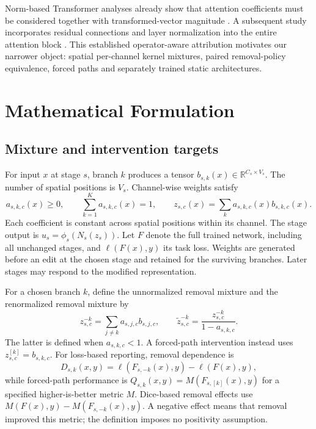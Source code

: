 \documentclass[mathematics,article,submit,pdftex,moreauthors]{Definitions/mdpi}
\begin{document}
Norm-based Transformer analyses already show that attention coefficients
must be considered together with transformed-vector magnitude
\cite{kobayashi2020norm}. A subsequent study incorporates residual
connections and layer normalization into the entire attention block
\cite{kobayashi2021normalization}. This established operator-aware attribution
motivates our narrower object: spatial per-channel kernel mixtures, paired
removal-policy equivalence, forced paths and separately trained static
architectures.

\section{Mathematical Formulation}
\subsection{Mixture and intervention targets}
For input $x$ at stage $s$, branch $k$ produces a tensor
$b_{s,k}(x)\in\mathbb{R}^{C_s\times V_s}$. The number of spatial positions
is $V_s$. Channel-wise weights satisfy
\begin{equation}
 a_{s,k,c}(x)\geq0,\qquad \sum_{k=1}^K a_{s,k,c}(x)=1,
 \qquad z_{s,c}(x)=\sum_k a_{s,k,c}(x)b_{s,k,c}(x).
\end{equation}
Each coefficient is constant across spatial positions within its channel.
The stage output is $u_s=\phi_s(N_s(z_s))$. Let $F$ denote the full trained
network, including all unchanged stages, and $\ell(F(x),y)$ its task loss.
Weights are generated before an edit at the chosen stage and retained for the
surviving branches. Later stages may respond to the modified representation.

For a chosen branch $k$, define the unnormalized removal mixture and the
renormalized removal mixture by
\begin{equation}\label{eq:remove}
 z_{s,c}^{-k}=\sum_{j\ne k}a_{s,j,c}b_{s,j,c},\qquad
 \widetilde z_{s,c}^{-k}=\frac{z_{s,c}^{-k}}{1-a_{s,k,c}}.
\end{equation}
The latter is defined when $a_{s,k,c}<1$. A forced-path intervention instead
uses $z_{s,c}^{[k]}=b_{s,k,c}$. For loss-based reporting, removal dependence is
\begin{equation}
 D_{s,k}(x,y)=\ell(F_{s,-k}(x),y)-\ell(F(x),y),
\end{equation}
while forced-path performance is $Q_{s,k}(x,y)=M(F_{s,[k]}(x),y)$ for a
specified higher-is-better metric $M$. Dice-based removal effects use
$M(F(x),y)-M(F_{s,-k}(x),y)$. A negative effect means that removal improved
this metric; the definition imposes no positivity assumption.
\end{document}
